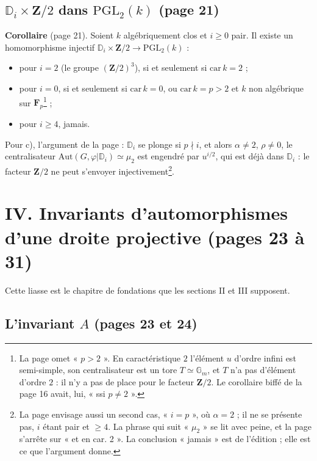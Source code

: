 \documentclass[11pt,a4paper]{article}
\begin{document}
\subsection*{$\mathbb{D}_i \times \mathbf{Z}/2$ dans $\mathrm{PGL}_2(k)$ (page 21)}

\textbf{Corollaire} (page 21). Soient $k$ algébriquement clos et $i \geq 0$
pair. Il existe un homomorphisme injectif $\mathbb{D}_i \times \mathbf{Z}/2
\to \mathrm{PGL}_2(k)$ :
\begin{itemize}
  \item[a)] pour $i = 2$ (le groupe $(\mathbf{Z}/2)^3$), si et seulement si
    $\mathrm{car}\, k = 2$ ;
  \item[b)] pour $i = 0$, si et seulement si $\mathrm{car}\, k = 0$, ou
    $\mathrm{car}\, k = p > 2$ et $k$ non algébrique sur
    $\mathbf{F}_p$\footnote{La page omet « $p > 2$ ». En caractéristique $2$
    l'élément $u$ d'ordre infini est semi-simple, son centralisateur est un tore
    $T \simeq \mathbb{G}_m$, et $T$ n'a pas d'élément d'ordre $2$ : il n'y a
    pas de place pour le facteur $\mathbf{Z}/2$. Le corollaire biffé de la
    page 16 avait, lui, « ssi $p \neq 2$ ».} ;
  \item[c)] pour $i \geq 4$, jamais.
\end{itemize}
Pour c), l'argument de la page : $\mathbb{D}_i$ se plonge si $p \nmid i$, et
alors $\alpha \neq 2$, $\rho \neq 0$, le centralisateur
$\mathrm{Aut}(G, \varphi|\mathbb{D}_i) \simeq \mu_2$ est engendré par $u^{i/2}$,
qui est déjà dans $\mathbb{D}_i$ : le facteur $\mathbf{Z}/2$ ne peut s'envoyer
injectivement\footnote{La page envisage aussi un second cas, « $i = p$ », où
$\alpha = 2$ ; il ne se présente pas, $i$ étant pair et $\geq 4$. La phrase
qui suit « $\mu_2$ » se lit avec peine, et la page s'arrête sur « et en
car. 2 ». La conclusion « jamais » est de l'édition ; elle est ce que
l'argument donne.}.

\section*{IV. Invariants d'automorphismes d'une droite projective (pages 23 à 31)}

Cette liasse est le chapitre de fondations que les sections II et III
supposent.

\subsection*{L'invariant $A$ (pages 23 et 24)}
\end{document}
